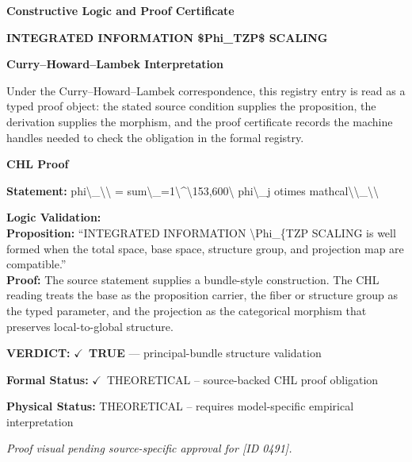 \clearpage
\begingroup\tzpsupportsetup
\noindent\textbf{\fontsize{10.8pt}{12.8pt}\selectfont [ID 0491] Constructive Logic and Proof Certificate}\par
\noindent\textbf{\fontsize{10pt}{12pt}\selectfont INTEGRATED INFORMATION \$Phi\_TZP\$ SCALING}\par
\vspace{0.45em}
\begingroup
\footnotesize
\setlength{\parskip}{0.22em}
\setlength{\parindent}{0pt}
\noindent\textbf{Curry--Howard--Lambek Interpretation}\par
Under the Curry--Howard--Lambek correspondence, this registry entry is read as a typed proof
object: the stated source condition supplies the proposition, the derivation supplies the
morphism, and the proof certificate records the machine handles needed to check the obligation
in the formal registry.

\vspace{0.45em}
\noindent\textbf{CHL Proof}\par
\textbf{Statement:} phi\textbackslash{}\_\textbackslash{}\textbackslash{} = sum\textbackslash{}\_=1\textbackslash{}\textasciicircum{}\textbackslash{}153,600\textbackslash{} phi\textbackslash{}\_j otimes mathcal\textbackslash{}\textbackslash{}\_\textbackslash{}\textbackslash{}

\textbf{Logic Validation:}\\
\textbf{Proposition:} ``INTEGRATED INFORMATION \textbackslash{}Phi\_\{TZP SCALING is well formed when the total space, base
space, structure group, and projection map are compatible.''\\
\textbf{Proof:} The source statement supplies a bundle-style construction. The CHL reading treats the
base as the proposition carrier, the fiber or structure group as the typed parameter,
and the projection as the categorical morphism that preserves local-to-global structure.

\textbf{VERDICT:} \ensuremath{\checkmark}\ \textbf{TRUE} --- principal-bundle structure validation

\textbf{Formal Status:} \ensuremath{\checkmark}\ THEORETICAL -- source-backed CHL proof obligation

\textbf{Physical Status:} THEORETICAL -- requires model-specific empirical interpretation
\par\vspace{0.45em}
\par
\vfill
\begingroup\footnotesize\itshape
Proof visual pending source-specific approval for [ID 0491].
\par\endgroup
\vfill
\endgroup
\endgroup
